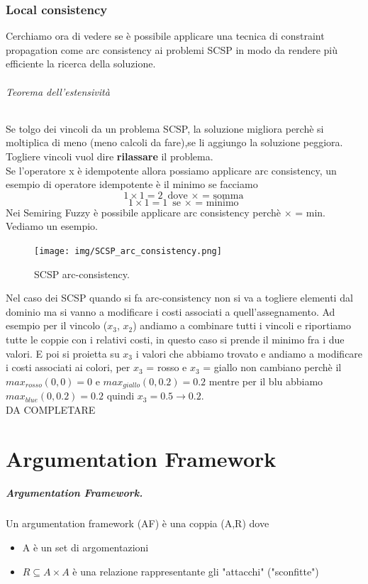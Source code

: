 \subsection{Local consistency}
Cerchiamo ora di vedere se è possibile applicare una tecnica di constraint propagation come arc consistency ai problemi SCSP in modo da rendere più efficiente la ricerca della soluzione. 
\subparagraph{Teorema dell'estensività} Se tolgo dei vincoli da un problema SCSP, la soluzione migliora perchè si moltiplica di meno (meno calcoli da fare),se li aggiungo la soluzione peggiora. Togliere vincoli vuol dire \textbf{rilassare} il problema.
\\
Se l'operatore x è idempotente allora possiamo applicare arc consistency, un esempio di operatore idempotente è il minimo se facciamo
\[1\times1= 2 \text{ dove $\times$ = somma}\]
\[1\times1= 1 \text{ se $\times$ = minimo}\]
Nei Semiring Fuzzy è possibile applicare arc consistency perchè $\times$ = min. Vediamo un esempio. 
\begin{figure}[H]
    \centering
    \texttt{[image: img/SCSP\_arc\_consistency.png]}
    \caption{SCSP arc-consistency.}\label{fig:SCSP_arc_consistency}
\end{figure}
Nel caso dei SCSP quando si fa arc-consistency non si va a togliere elementi dal dominio ma si vanno a modificare i costi associati a quell'assegnamento. Ad esempio per il vincolo ($x_3$, $x_2$) andiamo a combinare tutti i vincoli e riportiamo tutte le coppie con i relativi costi, in questo caso si prende il minimo fra i due valori. E poi si proietta su $x_3$ i valori che abbiamo trovato e andiamo a modificare i costi associati ai colori, per $x_3$ = rosso e $x_3$ = giallo non cambiano perchè il $max_{rosso}(0,0) = 0$ e $max_{giallo}(0,0.2) = 0.2$ mentre per il blu abbiamo $max_{blue}(0,0.2) = 0.2$ quindi $x_3= 0.5 \xrightarrow{}0.2$.
\\
DA COMPLETARE 
\\
\chapter{Argumentation Framework}
\paragraph{Argumentation Framework.}Un argumentation framework (AF) è una coppia (A,R) dove 
\begin{itemize}
    \item A è un set di argomentazioni 
    \item $R \subseteq  A\times  A$ è una relazione rappresentante gli "attacchi" ("sconfitte")
\end{itemize}

